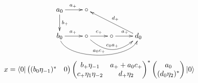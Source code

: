{	\begin{todo}[メモ]\label{todo:メモ} %
	\begin{equation*}\xymatrix{
		a_0 \ar[r]^{a_+} \ar[d]^{b_+} & \circ \\
		b_0 \ar[r]^{a_+} \ar@(d,d)[rrr]^{a_0c_+} 
			& \circ \ar[r]^{c_+} \ar@(rd,ld)[rr]^{c_0a_+} 
			& \circ \ar[r]^{a_+} & d_0 \ar[ull]_{d_+} \\
	}\end{equation*}
	\begin{equation*}\begin{split}
		x = \mathinner{\langle{0}|}\begin{pmatrix}
			(b_0\eta_{-1})^* & 0
		\end{pmatrix}\begin{pmatrix}
			b_+\eta_{-1} & a_+ + a_0c_+ \\
			c_+\eta_1\eta_{-2} & d_+\eta_2
		\end{pmatrix}^*\begin{pmatrix}
			a_0 \\ (d_0\eta_2)^*
		\end{pmatrix}\mathinner{|{0}\rangle}
	\end{split}\end{equation*}
	\end{todo} %

	\begin{todo}[ここまで]\label{todo:ここまで} %
	\end{todo} %

}
